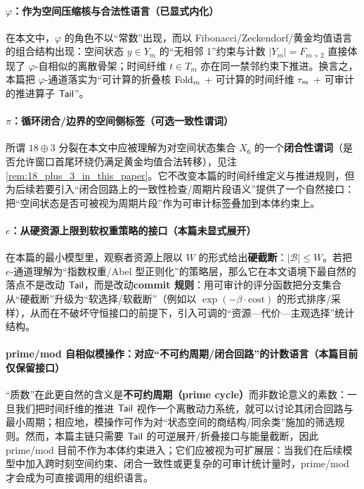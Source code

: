 \paragraph{\texorpdfstring{$\varphi$}{phi}：作为空间压缩核与合法性语言（已显式内化）}
在本文中，\(\varphi\) 的角色不以“常数”出现，而以 Fibonacci/Zeckendorf/黄金均值语言的组合结构出现：空间状态 \(y\in Y_m\) 的“无相邻 1”约束与计数 \(|Y_m|=F_{m+2}\) 直接体现了 \(\varphi\)-自相似的离散骨架；时间纤维 \(t\in T_m\) 亦在同一禁邻约束下推进。换言之，本篇把 \(\varphi\)-通道落实为“可计算的折叠核 \(\mathrm{Fold}_m\) + 可计算的时间纤维 \(\tau_m\) + 可审计的推进算子 \(\mathsf{Tail}\)”。

\paragraph{\texorpdfstring{$\pi$}{pi}：循环闭合/边界的空间侧标签（可选一致性谓词）}
所谓 \(18\oplus 3\) 分裂在本文中应被理解为对空间状态集合 \(X_6\) 的一个\textbf{闭合性谓词}（是否允许窗口首尾环绕仍满足黄金均值合法转移），见注 \ref{rem:18_plus_3_in_this_paper}。它不改变本篇的时间纤维定义与推进规则，但为后续若要引入“闭合回路上的一致性检查/周期片段语义”提供了一个自然接口：把“空间状态是否可被视为周期片段”作为可审计标签叠加到本体约束上。

\paragraph{\texorpdfstring{$e$}{e}：从硬资源上限到软权重策略的接口（本篇未显式展开）}
在本篇的最小模型里，观察者资源上限以 \(W\) 的形式给出\textbf{硬截断}：\(|\mathcal B|\le W\)。若把 \(e\)-通道理解为“指数权重/Abel 型正则化”的策略层，那么它在本文语境下最自然的落点不是改动 \(\mathsf{Tail}\)，而是改动\textbf{commit 规则}：用可审计的评分函数把分支集合从“硬截断”升级为“软选择/软截断”（例如以 \(\exp(-\beta\cdot \mathrm{cost})\) 的形式排序/采样），从而在不破坏守恒接口的前提下，引入可调的“资源—代价—主观选择”统计结构。

\paragraph{prime/mod 自相似模操作：对应“不可约周期/闭合回路”的计数语言（本篇目前仅保留接口）}
“质数”在此更自然的含义是\textbf{不可约周期（prime cycle）}而非数论意义的素数：一旦我们把时间纤维的推进 \(\mathsf{Tail}\) 视作一个离散动力系统，就可以讨论其闭合回路与最小周期；相应地，模操作可作为对“状态空间的商结构/同余类”施加的筛选规则。然而，本篇主链只需要 \(\mathsf{Tail}\) 的可逆展开/折叠接口与能量截断，因此 prime/mod 目前不作为本体约束进入；它们应被视为可扩展层：当我们在后续模型中加入跨时刻空间约束、闭合一致性或更复杂的可审计统计量时，prime/mod 才会成为可直接调用的组织语言。


